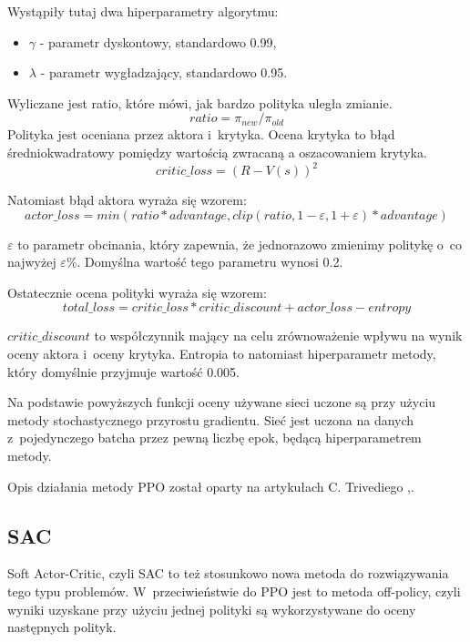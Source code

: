 \documentclass[a4paper,12pt]{article}
\begin{document}
Wystąpiły tutaj dwa hiperparametry algorytmu:
\begin{itemize}
	\item $\gamma$ - parametr dyskontowy, standardowo 0.99,
	\item $\lambda$ - parametr wygładzający, standardowo 0.95.
\end{itemize}

Wyliczane jest ratio, które mówi, jak bardzo polityka uległa zmianie.
\begin{equation}
	ratio = \pi_{new} / \pi_{old}
\end{equation}
Polityka jest oceniana przez aktora i~krytyka. Ocena krytyka to błąd średniokwadratowy pomiędzy wartością zwracaną a oszacowaniem krytyka.
\begin{equation}
	critic\_loss = (R - V(s))^2
\end{equation}

Natomiast błąd aktora wyraża się wzorem:
\begin{equation}
	actor\_loss = min(ratio * advantage, clip(ratio, 1-\varepsilon,1+\varepsilon)* advantage)
\end{equation}

$\varepsilon$ to parametr obcinania, który zapewnia, że jednorazowo zmienimy politykę o~co najwyżej $\varepsilon\%$. Domyślna wartość tego parametru wynosi 0.2.

Ostatecznie ocena polityki wyraża się wzorem:
\begin{equation}
	total\_loss = critic\_loss * critic\_discount + actor\_loss - entropy
\end{equation}

$critic\_discount$ to współczynnik mający na celu zrównoważenie wpływu na wynik oceny aktora i~oceny krytyka. Entropia to natomiast hiperparametr metody, który domyślnie przyjmuje wartość 0.005. 

Na podstawie powyższych funkcji oceny używane sieci uczone są przy użyciu metody stochastycznego przyrostu gradientu. Sieć jest uczona na danych z~pojedynczego batcha przez pewną liczbę epok, będącą hiperparametrem metody.

Opis działania metody PPO został oparty na artykułach C. Trivediego \cite{ppo1},\cite{ppo2}.


\subsection{SAC}
Soft Actor-Critic, czyli SAC to też stosunkowo nowa metoda do rozwiązywania tego typu problemów. W~przeciwieństwie do PPO jest to metoda off-policy, czyli wyniki uzyskane przy użyciu jednej polityki są wykorzystywane do oceny następnych polityk.
\end{document}
